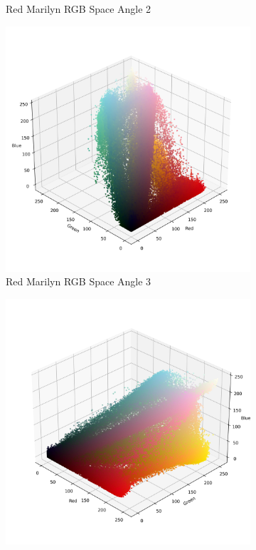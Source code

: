 \documentclass{article}
\begin{document}
\begin{figure}[ht]
\begin{subfigure}{0.24\textwidth}
    \caption{Red Marilyn RGB Space Angle 2}
    \label{fig:4_6_red_marilyn_original_scatter}
  \end{subfigure}
  \hfill
  \begin{subfigure}{0.24\textwidth}
    \includegraphics[width=\textwidth]{main_files/figure-latex/4_7_red_marilyn_original_scatter.jpg}
    \caption{Red Marilyn RGB Space Angle 3}
    \label{fig:4_7_red_marilyn_original_scatter}
  \end{subfigure}
  \hfill
  \begin{subfigure}{0.24\textwidth}
    \includegraphics[width=\textwidth]{main_files/figure-latex/4_8_red_marilyn_original_scatter.jpg}

\end{subfigure}
\end{figure}
\end{document}
